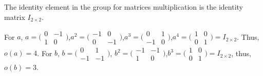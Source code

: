 \documentclass[12pt]{article}
\begin{document}
\subsection{} %
\subsection{} %
The identity element in the group for matrices multiplication is the identity matrix $I_{2\times2}$.

For $a$, $a=\big(\begin{smallmatrix}0 & -1\\1 & 0\end{smallmatrix}\big)$,$a^2=\big(\begin{smallmatrix}-1 & 0\\0 & -1\end{smallmatrix}\big)$,$a^3=\big(\begin{smallmatrix}0 & 1\\-1 & 0\end{smallmatrix}\big)$,$a^4=\big(\begin{smallmatrix}1 & 0\\0 & 1\end{smallmatrix}\big)=I_{2\times2}$. Thus, $o(a)=4$. For $b$, $b=\big(\begin{smallmatrix}0 & 1\\-1 & -1\end{smallmatrix}\big)$, $b^2=\big(\begin{smallmatrix}-1 & -1\\1 & 0\end{smallmatrix}\big)$,$b^3=\big(\begin{smallmatrix}1 & 0\\0 & 1\end{smallmatrix}\big)=I_{2\times2}$, thus, $o(b)=3$.










\newpage
\section{} %
\end{document}

